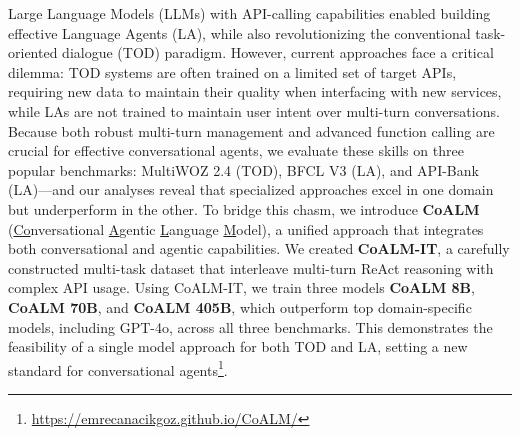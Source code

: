 Large Language Models (LLMs) with API-calling capabilities enabled building effective Language Agents (LA), while also revolutionizing the conventional task-oriented dialogue (TOD) paradigm.
However, current approaches face a critical dilemma: TOD systems are often trained on a limited set of target APIs, requiring new data to maintain their quality when interfacing with new services, while LAs are not trained to maintain user intent over multi-turn conversations. 
Because both robust multi-turn management and advanced function calling are crucial for effective conversational agents, we evaluate these skills on three popular benchmarks: MultiWOZ 2.4 (TOD), BFCL V3 (LA), and API-Bank (LA)—and our analyses reveal that specialized approaches excel in one domain but underperform in the other.
To bridge this chasm, we introduce \textbf{CoALM} (\uline{Co}nversational \uline{A}gentic \uline{L}anguage \uline{M}odel), a unified approach that integrates both conversational and agentic capabilities.
We created \textbf{CoALM-IT}, a carefully constructed multi-task dataset that interleave multi-turn ReAct reasoning with complex API usage. 
Using CoALM-IT, we train three models \textbf{CoALM 8B}, \textbf{CoALM 70B}, and \textbf{CoALM 405B}, which outperform top domain-specific models, including GPT-4o, across all three benchmarks. This demonstrates the feasibility of a single model approach for both TOD and LA, setting a new standard for conversational agents\footnote{\url{https://emrecanacikgoz.github.io/CoALM/}}.
